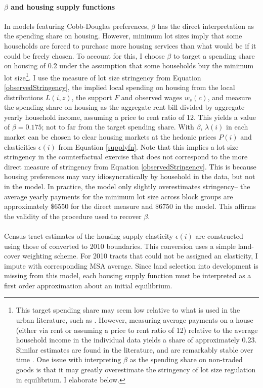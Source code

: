 \documentclass[]{article}
\begin{document}
\paragraph*{$\beta$ and housing supply functions}
In models featuring Cobb-Douglas preferences, $\beta$ has the direct interpretation as the spending share on housing. However, minimum lot sizes imply that some households are forced to purchase more housing services than what would be if it could be freely chosen. To account for this, I choose $\beta$ to target a spending share on housing of 0.2 under the assumption that some households buy the minimum lot size\footnote{This target spending share may seem low relative to what is used in the urban literature, such as \cite{diamond2016}. However, measuring average payments on a house (either via rent or assuming a price to rent ratio of 12) relative to the average household income in the individual data yields a share of approximately 0.23. Similar estimates are found in the literature, and are remarkably stable over time \citep{orlatomagnedavis}. One issue with interpreting $\beta$ as the spending share on non-traded goods is that it may greatly overestimate the stringency of lot size regulation in equilibrium. I elaborate below.}. I use the measure of lot size stringency from Equation \eqref{observedStringency},  the implied local spending on housing from the local distributions $L(i, z)$, the support $F$ and observed wages $w_{s}(c)$, and measure the spending share on housing as the aggregate rent bill divided by aggregate yearly household income, assuming a price to rent ratio of 12. This yields a value of $\beta = 0.175$; not to far from the target spending share. With $\beta$, $\lambda(i)$ in each market can be chosen to clear housing markets at the hedonic prices $P(i)$ and elasticities $\epsilon(i)$ from Equation \eqref{supplyfn}. Note that this implies a lot size stringency in the counterfactual exercise that does not correspond to the more direct measure of stringency from Equation \eqref{observedStringency}. This is because housing preferences may vary idiosyncratically by household in the data, but not in the model. In practice, the model only slightly overestimates stringency-- the average yearly payments for the minimum lot size across block groups are approximately $\$6550$ for the direct measure and $\$6750$ in the model. This affirms the validity of the procedure used to recover $\beta$.    

\paragraph*{}
Census tract estimates of the housing supply elasticity $\epsilon(i)$ are constructed using those of \cite{BSH} converted to 2010 boundaries. This conversion uses a simple land-cover weighting scheme. For 2010 tracts that could not be assigned an elasticity, I impute with corresponding MSA average. Since land selection into development is missing from this model, each housing supply function must be interpreted as a first order approximation about an initial equilibrium. 
\end{document}
